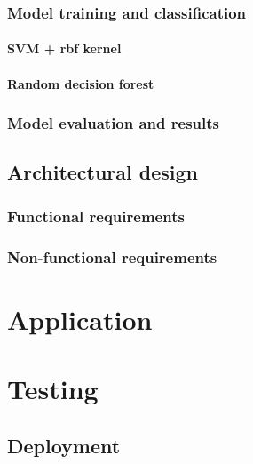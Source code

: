 \documentclass[
  digital, %
  oneside, %
  table,   %
  nolof,     %
  nolot,     %
]{fithesis3}
\begin{document}
\subsection{Model training and classification}
\subsubsection{SVM + rbf kernel}
\subsubsection{Random decision forest}
\subsection{Model evaluation and results}

\section{Architectural design}
\subsection{Functional requirements}
\subsection{Non-functional requirements}


\chapter{Application}




\chapter{Testing}

\section{Deployment}
\end{document}
